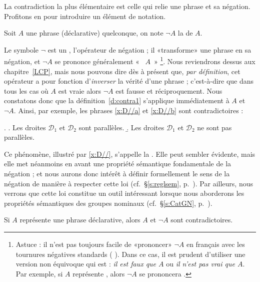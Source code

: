 \begin{refsegment}
La contradiction la plus élémentaire est celle qui relie une phrase et
sa négation.  Profitons en pour introduire un élément de notation.

\begin{nota}[Négation]
Soit $A$  une phrase (déclarative) quelconque, on note $\neg A$ la
 de $A$.
\end{nota}

Le symbole $\neg$ est un , l'opérateur de négation ; il
«transforme» une phrase en sa négation, et  $\neg A$ se prononce
généralement «~ $A$~»%
\footnote{Astuce :  il n'est pas toujours facile de «prononcer»
  $\neg A$ en français avec les
tournures négatives standards ({\ie} ).  Dans ce cas,
  il est prudent d'utiliser une version non équivoque qui est : \emph{il est faux que
  $A$} ou \emph{il n'est pas vrai que $A$}. Par exemple, si $A$
  représente , alors $\neg A$ se
  prononcera .}.
Nous reviendrons dessus
aux chapitre~\ref{LCP}, mais nous pouvons dire dès à présent que,
\emph{par définition}, cet opérateur a pour fonction d'\emph{inverser}
la vérité d'une phrase ; c'est-à-dire que dans tous les cas où $A$ est
vraie alors $\neg A$ est fausse et réciproquement.  Nous constatons donc
que la définition~\ref{d:contra1} s'applique immédiatement à $A$ et
$\neg A$.  Ainsi, par exemple, les phrases \ref{x:D//a} et \ref{x:D//b} sont contradictoires :

\ex. \label{x:D//}
\a.  Les droites $\mathscr D_1$ et $\mathscr D_2$ sont parallèles. \label{x:D//a}
\b. Les droites $\mathscr D_1$ et $\mathscr D_2$ ne sont pas parallèles. \label{x:D//b}


Ce phénomène, illustré par \ref{x:D//}, s'appelle la .  Elle peut sembler évidente, mais elle met néanmoins
en avant une propriété sémantique fondamentale de la négation ; et nous
  aurons donc intérêt à définir formellement le sens de la négation de
  manière %
à respecter cette loi (cf.\ \S\ref{s:reglsem}, p.~\pageref{s:reglsem}).  Par ailleurs, nous verrons que cette
  loi constitue un outil intéressant lorsque nous aborderons les
  propriétés sémantiques des groupes nominaux (cf.\ \S\ref{s:CatGN},
  p.~\pageref{s:CatGN}). 


\begin{defi}\label{loi:contrad}
Si $A$ représente une phrase déclarative, alors  $A$ et $\neg A$ sont contradictoires.
\end{defi}



\end{refsegment}
